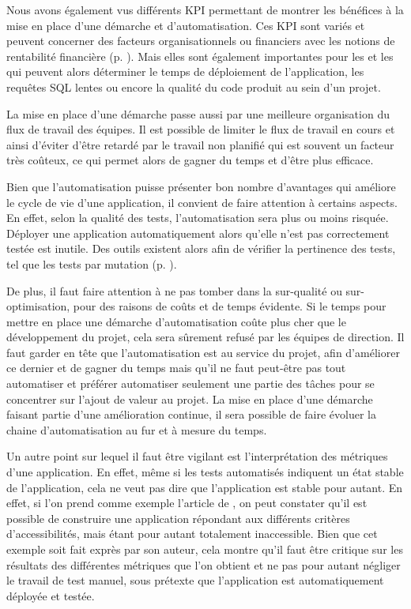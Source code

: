 Nous avons également vus différents \gls{KPI} permettant de montrer les bénéfices à la mise en place d'une démarche \devops{} et d'automatisation. Ces \gls{KPI} sont variés et peuvent concerner des facteurs organisationnels ou financiers avec les notions de rentabilité financière (p. \pageref{ref-rentabilite-finance}). Mais elles sont également importantes pour les \dev{} et les \ops{} qui peuvent alors déterminer le temps de déploiement de l'application, les requêtes \gls{SQL} lentes ou encore la qualité du code produit au sein d'un projet.

La mise en place d'une démarche \devops{} passe aussi par une meilleure organisation du flux de travail des équipes. Il est possible de limiter le flux de travail en cours et ainsi d'éviter d'être retardé par le travail non planifié qui est souvent un facteur très coûteux, ce qui permet alors de gagner du temps et d'être plus efficace.


Bien que l'automatisation puisse présenter bon nombre d'avantages qui améliore le cycle de vie d'une application, il convient de faire attention à certains aspects. En effet, selon la qualité des tests, l'automatisation sera plus ou moins risquée. Déployer une application automatiquement alors qu'elle n'est pas correctement testée est inutile. Des outils existent alors afin de vérifier la pertinence des tests, tel que les tests par mutation (p. \pageref{ref-mutation}). 

De plus, il faut faire attention à ne pas tomber dans la sur-qualité ou sur-optimisation, pour des raisons de coûts et de temps évidente. Si le temps pour mettre en place une démarche d'automatisation coûte plus cher que le développement du projet, cela sera sûrement refusé par les équipes de direction. Il faut garder en tête que l'automatisation est au service du projet, afin d'améliorer ce dernier et de gagner du temps mais qu'il ne faut peut-être pas tout automatiser et préférer automatiser seulement une partie des tâches pour se concentrer sur l'ajout de valeur au projet. La mise en place d'une démarche \devops{} faisant partie d'une amélioration continue, il sera possible de faire évoluer la chaine d'automatisation au fur et à mesure du temps.

Un autre point sur lequel il faut être vigilant est l'interprétation des métriques d'une application. En effet, même si les tests automatisés indiquent un état stable de l'application, cela ne veut pas dire que l'application est stable pour autant. En effet, si l'on prend comme exemple l'article   de \citeauthor{web_inaccessible_app} \cite{web_inaccessible_app}, on peut constater qu'il est possible de construire une application répondant aux différents critères d'accessibilités, mais étant pour autant totalement inaccessible. Bien que cet exemple soit fait exprès par son auteur, cela montre qu'il faut être critique sur les résultats des différentes métriques que l'on obtient et ne pas pour autant négliger le travail de test manuel, sous prétexte que l'application est automatiquement déployée et testée.

